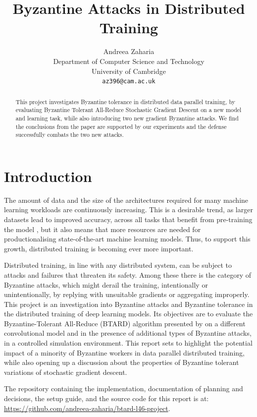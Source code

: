 \documentclass{article}
\title{Byzantine Attacks in Distributed Training}
\author{%
  Andreea Zaharia \\
  Department of Computer Science and Technology\\
  University of Cambridge\\
  \texttt{az396@cam.ac.uk} \\
}
\begin{document}
\maketitle

\begin{abstract}
This project investigates Byzantine tolerance in distributed data parallel training, by evaluating Byzantine Tolerant All-Reduce Stochastic Gradient Descent \citep{gorbunov2021secure} on a new model and learning task, while also introducing two new gradient Byzantine attacks. We find the conclusions from the paper are supported by our experiments and the defense successfully combats the two new attacks.
\end{abstract}
\section{Introduction}
The amount of data and the size of the architectures required for many machine learning workloads are continuously increasing. This is a desirable trend, as larger datasets lead to improved accuracy, across all tasks that benefit from pre-training the model \citep{goyal2017accurate}, but it also means that more resources are needed for productionalising state-of-the-art machine learning models. Thus, to support this growth, distributed training is becoming ever more important.

Distributed training, in line with any distributed system, can be subject to attacks and failures that threaten its safety. Among these there is the category of Byzantine attacks, which might derail the training, intentionally or unintentionally, by replying with unsuitable gradients or aggregating improperly. This project is an investigation into Byzantine attacks and Byzantine tolerance in the distributed training of deep learning models. Its objectives are to evaluate the Byzantine-Tolerant All-Reduce (BTARD) algorithm presented by \cite{gorbunov2021secure} on a different convolutional model and in the presence of additional types of Byzantine attacks, in a controlled simulation environment. This report sets to highlight the potential impact of a minority of Byzantine workers in data parallel distributed training, while also opening up a discussion about the properties of Byzantine tolerant variations of stochastic gradient descent.

The repository containing the implementation, documentation of planning and decisions, the setup guide, and the source code for this report is at: \url{https://github.com/andreea-zaharia/btard-l46-project}.
\end{document}
